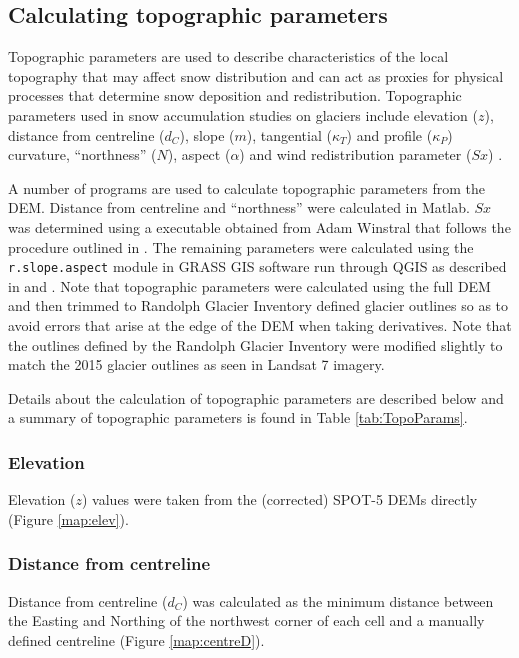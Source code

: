 \documentclass{sfuthesis}
\begin{document}
\subsection{Calculating topographic parameters}
\label{sec:topoCalc}

Topographic parameters are used to describe characteristics of the local topography that may affect snow distribution and can act as proxies for physical processes that determine snow deposition and redistribution. Topographic parameters used in snow accumulation studies on glaciers include elevation ($z$), distance from centreline ($d_C$), slope ($m$), tangential ($\kappa_T$) and profile ($\kappa_P$) curvature, ``northness'' ($N$), aspect ($\alpha$) and wind redistribution parameter ($Sx$) \citep{Basist1994, Revuelto2014, McGrath2015}.	
 
A number of programs are used to calculate topographic parameters from the DEM. Distance from centreline and ``northness'' were calculated in Matlab. $Sx$ was determined using a executable obtained from Adam Winstral that follows the procedure outlined in \cite{Winstral2002}. The remaining parameters were calculated using the \texttt{r.slope.aspect} module in GRASS GIS software run through QGIS as described in \cite{Mitavsova1993} and \cite{Hofierka2009}. Note that topographic parameters were calculated using the full DEM and then trimmed to Randolph Glacier Inventory defined glacier outlines so as to avoid errors that arise at the edge of the DEM when taking derivatives. Note that the outlines defined by the Randolph Glacier Inventory were modified slightly to match the 2015 glacier outlines as seen in Landsat 7 imagery.

Details about the calculation of topographic parameters are described below and a summary of topographic parameters is found in Table \ref{tab:TopoParams}.
\subsubsection*{Elevation}

Elevation ($z$) values were taken from the (corrected) SPOT-5 DEMs directly (Figure \ref{map:elev}).

\subsubsection*{Distance from centreline}

Distance from centreline ($d_C$) was calculated as the minimum distance between the Easting and Northing of the northwest corner of each cell and a manually defined centreline (Figure \ref{map:centreD}). 
\end{document}
